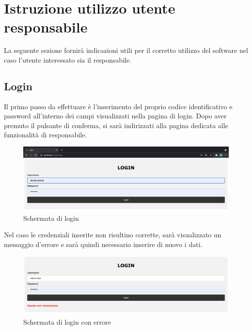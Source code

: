 \section{Istruzione utilizzo utente responsabile}

La seguente sezione fornirà indicazioni utili per il corretto utilizzo del software nel caso l'utente interessato sia il responsabile.

\subsection{Login}
Il primo passo da effettuare è l'inserimento del proprio codice identificativo e password all'interno dei campi visualizzati nella pagina di login. Dopo aver premuto il pulsante di conferma, si sarà indirizzati alla pagina dedicata alle funzionalità di responsabile. 
\begin{figure}[H]
    \centering
    \includegraphics[scale=0.2]{res/images/login2.png}
    \caption{Schermata di login}
\end{figure}
Nel caso le credenziali inserite non risultino corrette, sarà visualizzato un messaggio d'errore e sarà quindi necessario inserire di nuovo i dati.
\begin{figure}[H]
    \centering
    \includegraphics[scale=0.3]{res/images/login_errato2.png}
    \caption{Schermata di login con errore}
\end{figure}


